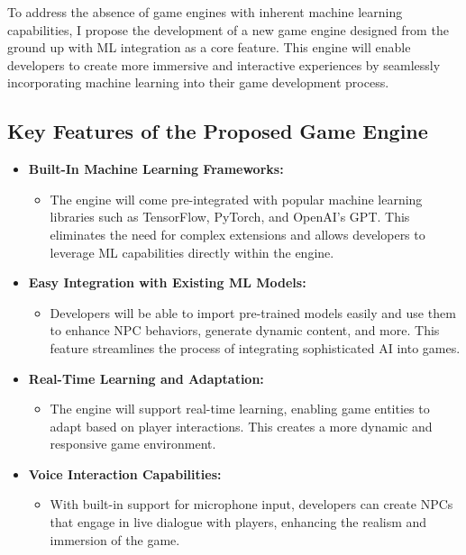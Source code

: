 





To address the absence of game engines with inherent machine learning capabilities, 
I propose the development of a new game engine designed from the ground up with ML integration as a core feature. 
This engine will enable developers to create more immersive and interactive experiences by seamlessly incorporating machine learning into their game development process.

\subsection*{Key Features of the Proposed Game Engine}

\begin{itemize}
    \item \textbf{Built-In Machine Learning Frameworks:}
    \begin{itemize}
        \item The engine will come pre-integrated with popular machine learning libraries such as TensorFlow, PyTorch, and OpenAI's GPT. 
This eliminates the need for complex extensions and allows developers to leverage ML capabilities directly within the engine.
    \end{itemize}
    
    \item \textbf{Easy Integration with Existing ML Models:}
    \begin{itemize}
        \item Developers will be able to import pre-trained models easily and use them to enhance NPC behaviors, generate dynamic content, and more. This feature streamlines the process of integrating sophisticated AI into games.
    \end{itemize}
    
    \item \textbf{Real-Time Learning and Adaptation:}
    \begin{itemize}
        \item The engine will support real-time learning, enabling game entities to adapt based on player interactions. This creates a more dynamic and responsive game environment.
    \end{itemize}
    
    \item \textbf{Voice Interaction Capabilities:}
    \begin{itemize}
        \item With built-in support for microphone input, developers can create NPCs that engage in live dialogue with players, enhancing the realism and immersion of the game.
    \end{itemize}
    

\end{itemize}
